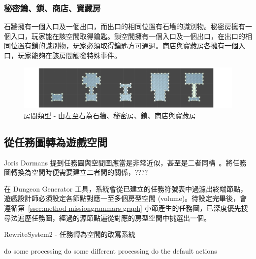 \subsubsection{秘密鑰、鎖、商店、寶藏房}
\label{sssec:method-spacepieces-types-special}

石牆擁有一個入口及一個出口，而出口的相同位置有石墻的識別物。秘密房擁有一個入口，玩家能在該空間取得鑰匙。鎖空間擁有一個入口及一個出口，在出口的相同位置有鎖的識別物，玩家必須取得鑰匙方可通過。商店與寶藏房各擁有一個入口，玩家能夠在該房間觸發特殊事件。

\begin{figure}[ht]
  \begin{center}
    \includegraphics[width=1.0\textwidth]{figures/roomtype-special.png}
    \caption{房間類型 - 由左至右為石牆、秘密房、鎖、商店與寶藏房}
    \label{fig:roomtype-special}
  \end{center}
\end{figure}

\subsection{從任務圖轉為遊戲空間}
\label{ssec:method-spacepieces-frommissiontospace}

Joris Dormans 提到任務圖與空間圖應當是非常近似，甚至是二者同構~\cite{dormans2010adventures}。將任務圖轉換為空間時便需要建立二者間的關係，????

在 Dungeon Generator 工具，系統會從已建立的任務符號表中過濾出終端節點，遊戲設計師必須設定各節點對應一至多個房型空間 (volume)。待設定完畢後，會遵循第~\ref{ssec:method-missiongrammars-graph} 小節產生的任務圖，已深度優先搜尋法遍歷任務圖，經過的源節點遍從對應的房型空間中挑選出一個。

\begin{algorithm}
    \caption{RewriteSystem2 - 任務轉為空間的改寫系統}
    \label{alg:algorithm-mission-to-space-rewritesystem}
    \begin{algorithmic}
            \STATE do some processing
            \STATE do some different processing
        \ELSE
            \STATE do the default actions
        \ENDIF
    \end{algorithmic}
\end{algorithm}

